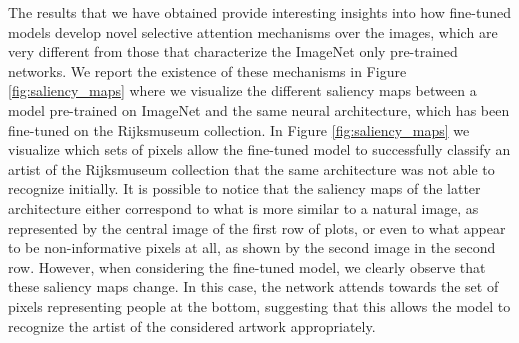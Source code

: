 The results that we have obtained provide interesting insights into how fine-tuned models develop novel selective attention mechanisms over the images, which are very different from those that characterize the ImageNet only pre-trained networks. We report the existence of these mechanisms in Figure \ref{fig:saliency_maps} where we visualize the different saliency maps between a model pre-trained on ImageNet and the same neural architecture, which has been fine-tuned on the Rijksmuseum collection. In Figure \ref{fig:saliency_maps} we visualize which sets of pixels allow the fine-tuned model to successfully classify an artist of the Rijksmuseum collection that the same architecture was not able to recognize initially. It is possible to notice that the saliency maps of the latter architecture either correspond to what is more similar to a natural image, as represented by the central image of the first row of plots, or even to what appear to be non-informative pixels at all, as shown by the second image in the second row. However, when considering the fine-tuned model, we clearly observe that these saliency maps change. In this case, the network attends towards the set of pixels representing people at the bottom, suggesting that this allows the model to recognize the artist of the considered artwork appropriately.

